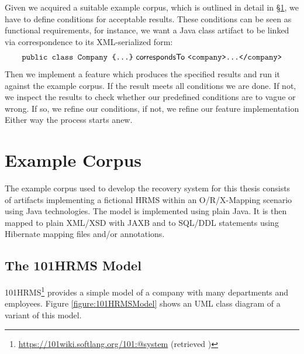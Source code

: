 Given we acquired a suitable example corpus, which is outlined in detail in §\ref{section:ExampleCorpus}, we have to define conditions for acceptable results.
These conditions can be seen as functional requirements, for instance, we want a \Gls{Java} class artifact to be linked via correspondence to its \acrshort{XML}-serialized form:
{
\footnotesize
\begin{align*}
\texttt{public class Company \{...\}} ~\textsf{correspondsTo}~ \texttt{<company>...</company>}
\end{align*}
}%
Then we implement a feature which produces the specified results and run it against the example corpus.
If the result meets all conditions we are done.
If not, we inspect the results to check whether our predefined conditions are to vague or wrong.
If so, we refine our conditions, if not, we refine our feature implementation
Either way the process starts anew.


\section{Example Corpus}
\label{section:ExampleCorpus}
The example corpus used to develop the recovery system for this thesis consists of artifacts implementing a fictional \acrshort{HRMS} within an \acrfull{O/R/X-Mapping} scenario using \Gls{Java} technologies.
The model is implemented using plain \Gls{Java}. 
It is then mapped to plain \acrshort{XML}/\acrshort{XSD} with \acrshort{JAXB} and to \acrshort{SQL}/\acrshort{DDL} statements using \Gls{Hibernate} mapping files and/or annotations.



\subsection{The 101HRMS Model}
\acrfull{101HRMS}\footnote{\url{https://101wiki.softlang.org/101:@system} (retrieved )} provides a simple model of a company with many departments and employees.
Figure \ref{figure:101HRMSModel} shows an \acrshort{UML} class diagram of a variant of this model.

